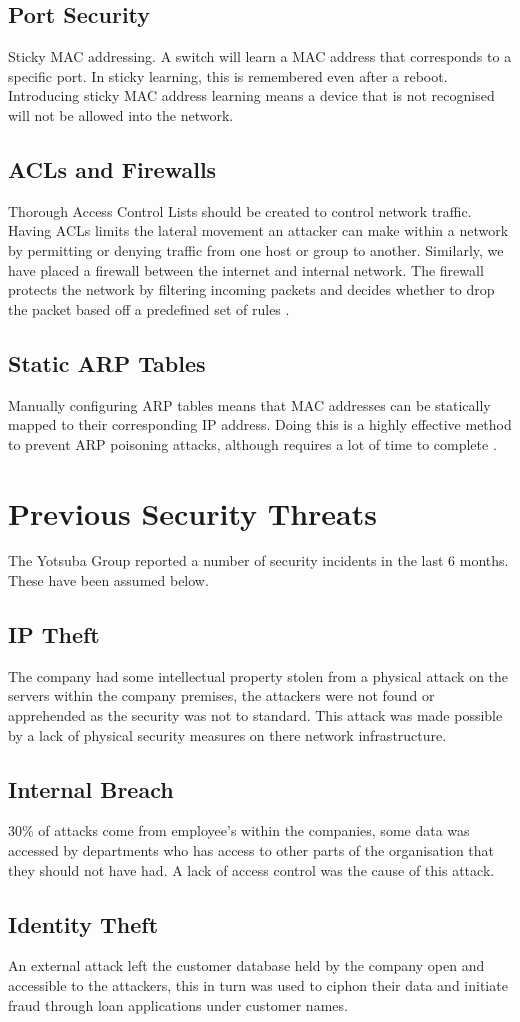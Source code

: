 \subsection{Port Security}
Sticky MAC addressing. A switch will learn a MAC address that corresponds to a specific port. In sticky learning, this is remembered even after a reboot. Introducing sticky MAC address learning means a device that is not recognised will not be allowed into the network.
\subsection{ACLs and Firewalls}
Thorough Access Control Lists should be created to control network traffic. Having ACLs limits the lateral movement an attacker can make within a network by permitting or denying traffic from one host or group to another. Similarly, we have placed a firewall between the internet and internal network. The firewall protects the network by filtering incoming packets and decides whether to drop the packet based off a predefined set of rules \parencite{cisco-firewall}.
\subsection{Static ARP Tables}
Manually configuring ARP tables means that MAC addresses can be statically mapped to their corresponding IP address. Doing this is a highly effective method to prevent ARP poisoning attacks, although requires a lot of time to complete \parencite{arp-posioning}. 

\section{Previous Security Threats}
The Yotsuba Group reported a number of security incidents in the last 6 months. These have been assumed below.
\subsection{IP Theft}
The company had some intellectual property stolen from a physical attack on the servers within the company premises, the attackers were not found or apprehended as the security was not to standard. This attack was made possible by a lack of physical security measures on there network infrastructure.
\subsection{Internal Breach}
30\% of attacks come from employee’s within the companies, some data was accessed by departments who has access to other parts of the organisation that they should not have had. A lack of access control was the cause of this attack.
\subsection{Identity Theft}
An external attack left the customer database held by the company open and accessible to the attackers, this in turn was used to ciphon their data and initiate fraud through loan applications under customer names.